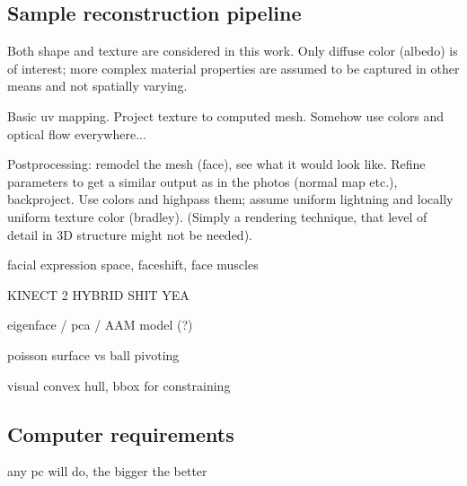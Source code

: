 
\subsection{Sample reconstruction pipeline} %

Both shape and texture are considered in this work. Only diffuse color (albedo) is of interest; more complex material properties are assumed to be captured in other means and not spatially varying.

Basic uv mapping. Project texture to computed mesh. Somehow use colors and optical flow everywhere...

Postprocessing: remodel the mesh (face), see what it would look like. Refine parameters to get a similar output as in the photos (normal map etc.), backproject. Use colors and highpass them; assume uniform lightning and locally uniform texture color (bradley). (Simply a rendering technique, that level of detail in 3D structure might not be needed).

facial expression space, faceshift, face muscles

KINECT 2 HYBRID SHIT YEA

eigenface / pca / AAM model (?)

poisson surface vs ball pivoting

visual convex hull, bbox for constraining


\subsection{Computer requirements} %

any pc will do, the bigger the better


